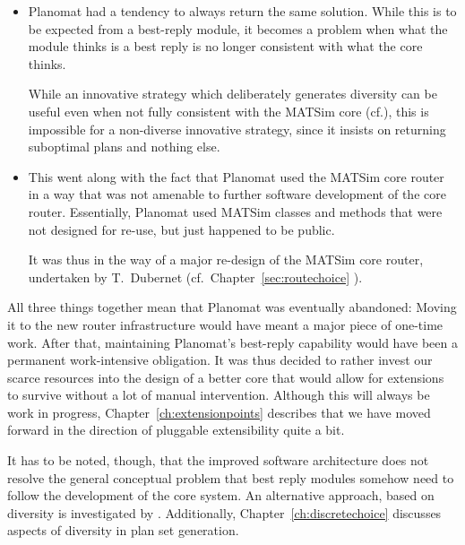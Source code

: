 \begin{itemize}

\item Planomat had a tendency to always return the same solution.  While this is to be expected from a best-reply module, it becomes a problem when what the module thinks is a best reply is no longer consistent with what the core thinks.  

While an innovative strategy which deliberately generates  diversity can be useful even when not fully consistent with the MATSim core (cf.\cite{NagelKickhoeferJoubertHeterogeneousVoTs}), this is impossible for a non-diverse innovative strategy, since it insists on returning suboptimal plans and nothing else.

\item This went along with the fact that Planomat used the MATSim core router in a way that was not amenable to further software development of the core router.  Essentially, Planomat used MATSim classes and methods that were not designed for re-use, but just happened to be public.

It was thus in the way of a major re-design of the MATSim core router, undertaken by T.~Dubernet (cf.~Chapter~\ref{sec:routechoice} ).

\end{itemize}

All three things together mean that Planomat was eventually abandoned: Moving it to the new router infrastructure would have meant a major piece of one-time work.  After that, maintaining Planomat's best-reply capability would have been a permanent work-intensive obligation.  It was thus decided to rather invest our scarce resources into the design of a better core that would allow for extensions to survive without a lot of manual intervention.  Although this will always be work in progress, Chapter~\ref{ch:extensionpoints} describes that we have moved forward in the direction of pluggable extensibility quite a bit.

It has to be noted, though, that the improved software architecture does not resolve the general conceptual problem that best reply modules somehow need to follow the development of the core system.  An alternative approach, based on diversity is investigated by \cite{NagelKickhoeferJoubertHeterogeneousVoTs}.  Additionally, Chapter~\ref{ch:discretechoice} discusses aspects of diversity in plan set generation.

